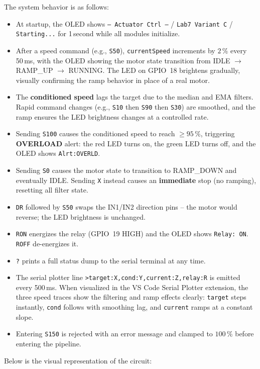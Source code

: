 The system behavior is as follows:
\begin{itemize}
  \item At startup, the OLED shows \texttt{-- Actuator Ctrl --} / \texttt{Lab7 Variant C}
    / \texttt{Starting...} for 1\,second while all modules initialize.
  \item After a speed command (e.g., \texttt{S50}), \texttt{currentSpeed} increments
    by $2\,\%$ every 50\,ms, with the OLED showing the motor state transition from
    IDLE $\to$ RAMP\_UP $\to$ RUNNING. The LED on GPIO~18 brightens gradually,
    visually confirming the ramp behavior in place of a real motor.
  \item The \textbf{conditioned speed} lags the target due to the median and EMA filters.
    Rapid command changes (e.g., \texttt{S10} then \texttt{S90} then \texttt{S30})
    are smoothed, and the ramp ensures the LED brightness changes at a controlled rate.
  \item Sending \texttt{S100} causes the conditioned speed to reach $\geq 95\,\%$,
    triggering \textbf{OVERLOAD} alert: the red LED turns on, the green LED turns off,
    and the OLED shows \texttt{Alrt:OVERLD}.
  \item Sending \texttt{S0} causes the motor state to transition to RAMP\_DOWN and
    eventually IDLE. Sending \texttt{X} instead causes an \textbf{immediate} stop
    (no ramping), resetting all filter state.
  \item \texttt{DR} followed by \texttt{S50} swaps the IN1/IN2 direction pins --
    the motor would reverse; the LED brightness is unchanged.
  \item \texttt{RON} energizes the relay (GPIO~19 HIGH) and the OLED shows
    \texttt{Relay: ON}. \texttt{ROFF} de-energizes it.
  \item \texttt{?} prints a full status dump to the serial terminal at any time.
  \item The serial plotter line \texttt{>target:X,cond:Y,current:Z,relay:R} is emitted
    every 500\,ms. When visualized in the VS Code Serial Plotter extension, the three
    speed traces show the filtering and ramp effects clearly: \texttt{target} steps
    instantly, \texttt{cond} follows with smoothing lag, and \texttt{current} ramps
    at a constant slope.
  \item Entering \texttt{S150} is rejected with an error message and clamped to
    $100\,\%$ before entering the pipeline.
\end{itemize}

\clearpage
Below is the visual representation of the circuit:

